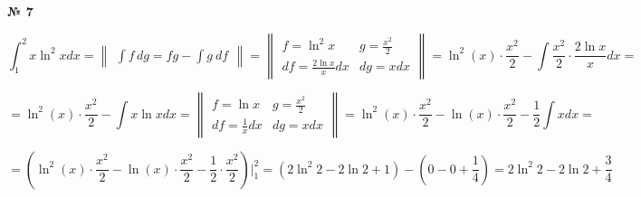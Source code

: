 \documentclass{article}
\begin{document}
\textbf{№ 7} 

$$ \int_{1}^{2} x\ln^2{x} dx 
= \begin{Vmatrix} \int f \,dg = fg - \int g \ df \end{Vmatrix} 
= \begin{Vmatrix} f = \ln^2{x} &  g = \frac{x^2}{2} \\
                 df = \frac{2\ln{x}}{x}dx  & dg = x dx \end{Vmatrix} 
= \ln^2{(x)} \cdot \frac{x^2}{2} - \int \frac{x^2}{2} \cdot \frac{2\ln{x}}{x} dx 
= $$

$$ = \ln^2{(x)} \cdot \frac{x^2}{2} - \int x\ln{x} dx 
= \begin{Vmatrix} f = \ln{x} &  g = \frac{x^2}{2} \\
                 df = \frac{1}{x}dx  & dg = x dx \end{Vmatrix} 
= \ln^2{(x)} \cdot \frac{x^2}{2} - \ln{(x)} \cdot \frac{x^2}{2} - \frac{1}{2} \int x dx
= $$

$$ = \left( \ln^2{(x)} \cdot \frac{x^2}{2} - \ln{(x)} \cdot \frac{x^2}{2} - \frac{1}{2} \cdot \frac{x^2}{2}  \right) \bigg\vert_{1}^{2}
= \left( 2\ln^2{2} - 2\ln{2} + 1 \right) - \left( 0 - 0 + \frac{1}{4} \right)
= 2\ln^2{2} - 2\ln{2} + \frac{3}{4} $$
\end{document}

